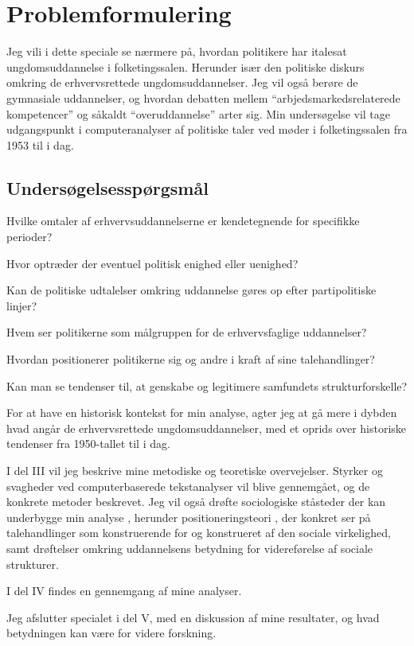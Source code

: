 \chapter{Problemformulering}\label{chap:pf}
Jeg vili i dette speciale se nærmere på, hvordan politikere har italesat ungdomsuddannelse i folketingssalen.
Herunder især den politiske diskurs omkring de erhvervsrettede ungdomsuddannelser.
Jeg vil også berøre de gymnasiale uddannelser, og hvordan debatten mellem “arbjedsmarkedsrelaterede kompetencer” og såkaldt “overuddannelse” arter sig.
Min undersøgelse vil tage udgangspunkt i computeranalyser af politiske taler ved møder i folketingssalen fra 1953 til i dag.

\section{Undersøgelsesspørgsmål}\label{seq:resqs}

Hvilke omtaler af erhvervsuddannelserne er kendetegnende for specifikke perioder? 

Hvor optræder der eventuel politisk enighed eller uenighed? 

Kan de politiske udtalelser omkring uddannelse gøres op efter partipolitiske linjer?

Hvem ser politikerne som målgruppen for de erhvervsfaglige uddannelser?

Hvordan positionerer politikerne sig og andre i kraft af sine talehandlinger?

Kan man se tendenser til, at genskabe og legitimere samfundets strukturforskelle? 


For at have en historisk kontekst for min analyse, agter jeg at gå mere i dybden hvad angår de erhvervsrettede ungdomsuddannelser, med et oprids over historiske tendenser fra 1950-tallet til i dag.

I del III vil jeg beskrive mine metodiske og teoretiske overvejelser.
Styrker og svagheder ved computerbaserede tekstanalyser vil blive gennemgået, og de konkrete metoder beskrevet.
Jeg vil også drøfte sociologiske ståsteder der kan underbygge min analyse , herunder positioneringsteori , der konkret ser på talehandlinger som konstruerende for og konstrueret af den sociale virkelighed, samt drøftelser omkring uddannelsens betydning for videreførelse af sociale strukturer.

I del IV findes en gennemgang af mine analyser.

Jeg afslutter specialet i del V, med en diskussion af mine resultater, og hvad betydningen kan være for videre forskning.
